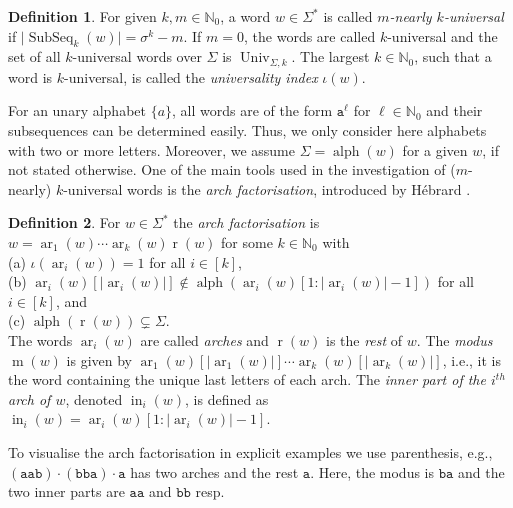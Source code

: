 \documentclass[10pt,a4paper]{amsart}
\newcommand{\N}{\mathbb{N}}
\def\ta{\mathtt{a}}
\def\tb{\mathtt{b}}
\def\r{\operatorname{r}}
\def\m{\operatorname{m}}
\DeclareMathOperator{\ar}{ar}
\DeclareMathOperator\ScatFact{SubSeq}
\DeclareMathOperator{\letters}{alph}
\DeclareMathOperator{\NUniv}{NUniv}
\DeclareMathOperator{\Univ}{Univ}
\DeclareMathOperator{\inner}{in}
\theoremstyle{plain}
\theoremstyle{definition}
\newtheorem{definition}{Definition}
\begin{document}
\begin{definition}
	For given $k,m\in\N_0$, a word $w \in \Sigma^*$ is called \emph{$m$-nearly $k$-universal} if $\vert \ScatFact_k(w) \vert $$= 
	\sigma^k-m$. %
	If $m=0$, the words are called $k$-universal and the set of all $k$-universal words over $\Sigma$ is $\Univ_{\Sigma,k}$. The largest $k\in\N_0$, such that a word is $k$-universal, is called the {\em universality index} $\iota(w)$.
\end{definition}


For an unary alphabet $\{a\}$, all words are of the form $\ta^{\ell}$ for $\ell\in\N_0$ and their subsequences can be determined easily.  Thus, we only consider here alphabets with two or more letters. Moreover, we assume $\Sigma=\letters(w)$ 
for a given $w$, if not stated otherwise.
One of the main tools used in the investigation of ($m$-nearly) $k$-universal words is the \emph{arch factorisation}, introduced by Hébrard \cite{DBLP:journals/tcs/Hebrard91}. 

\begin{definition}
	For $w \in \Sigma^*$ the \emph{arch factorisation} is $w = \ar_1(w) \cdots \ar_k(w) \r(w)$ for some $k \in \mathbb{N}_0$ with\\
	(a) $\iota(\ar_i(w))=1$ for all $i \in [k]$, \\
	(b) $\ar_i(w)[\vert \ar_i(w) \vert] \notin \letters(\ar_i(w)[1 : \vert \ar_i(w) \vert - 1 ])$ for all $i \in [k]$, and\\
	(c) $\letters(\r(w)) \subsetneq \Sigma$.\\
	The words $\ar_i(w)$ are called \emph{arches} and $\r(w)$ is the \emph{rest} of $w$.
	The {\em modus} $\m(w)$ is given by  $\ar_1(w)[\vert\ar_1(w)\vert] \cdots\ar_k(w)[\vert\ar_k(w)\vert]$, i.e., it is the word containing the unique last letters of each arch.
	The \emph{inner part of the $i^{th}$ arch of $w$}, denoted $\inner_i(w)$, is defined as $ \inner_i(w) = \ar_i(w)[1 : \vert \ar_i(w) \vert - 1 ]$.
\end{definition}

To visualise the arch factorisation in explicit examples we use parenthesis, e.g.,  $(\mathtt{aab})\cdot (\mathtt{bba}) \cdot \ta$ has two arches and the rest $\ta$. Here, the modus is $\tb\ta$ and the two inner parts are $\ta\ta$ and $\tb\tb$ resp.
\end{document}
